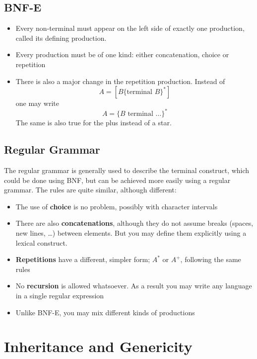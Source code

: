 \documentclass[a4paper]{article}
\begin{document}
\subsection{BNF-E}
\begin{itemize}
\item Every non-terminal must appear on the left side of exactly one production, called its defining production. 
\item Every production must be of one kind: either concatenation, choice or repetition
\item There is also a major change in the repetition production. Instead of \[A=[B \{\text{terminal }B\}^*]\] one may write \[A=\{B\text{ terminal }\dots\}^*\] The same is also true for the plus instead of a star.
\end{itemize}

\subsection{Regular Grammar}
The regular grammar is generally used to describe the terminal construct, which could be done using BNF, but can be achieved more easily using a regular grammar. The rules are quite similar, although different:
\begin{itemize}
\item The use of \textbf{choice} is no problem, possibly with character intervals
\item There are also \textbf{concatenations}, although they do not assume breaks (spaces, new lines, \dots) between elements. But you may define them explicitly using a lexical construct.
\item \textbf{Repetitions} have a different, simpler form; $A^*$ or $A^+$, following the same rules
\item No \textbf{recursion} is allowed whatsoever. As a result you may write any language in a single regular expression
\item Unlike BNF-E, you may mix different kinds of productions 
\end{itemize}

\section{Inheritance and Genericity}
\end{document}
